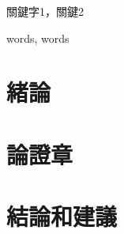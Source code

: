 \documentclass{format/MUSTThesisC}
\begin{document}




\AddToShipoutPicture{\BackgroundPic}



\def\Ctitle 		{中文題目}
\def\Etitle 		{英文題目}
\def\Sname 			{Y.J.Li}
\def\Sno 			{1809853G-BM30-0053}
\def\Sfaculty 		{商學院}
\def\Sprogram 		{XXX}
\def\Smajor 		{XXXX}
\def\Ssupervisor	{A/Prof.Jenny}
\def\Sdate			{\today}

\mustTitle



\mustCabstract
{
	
}
{關鍵字1，關鍵2}



\mustEabstract
{
	
}
{words, words}



\mustcontents



\linespread{1.65}\selectfont


\chapter{緒論}

\chapter{論證章}

\chapter{結論和建議}





\bibreference



\MUSTappendix{
	
}
\end{document}
